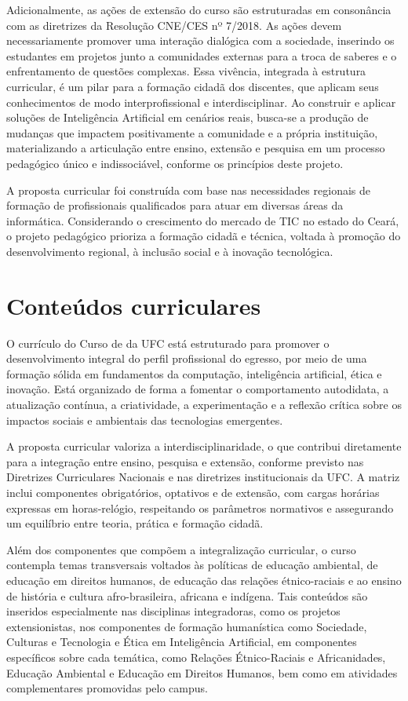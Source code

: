 Adicionalmente, as ações de extensão do curso são estruturadas em consonância com as diretrizes da Resolução CNE/CES nº 7/2018. As ações devem necessariamente promover uma interação dialógica com a sociedade, inserindo os estudantes em projetos junto a comunidades externas para a troca de saberes e o enfrentamento de questões complexas. Essa vivência, integrada à estrutura curricular, é um pilar para a formação cidadã dos discentes, que aplicam seus conhecimentos de modo interprofissional e interdisciplinar. Ao construir e aplicar soluções de Inteligência Artificial em cenários reais, busca-se a produção de mudanças que impactem positivamente a comunidade e a própria instituição, materializando a articulação entre ensino, extensão e pesquisa em um processo pedagógico único e indissociável, conforme os princípios deste projeto.

A proposta curricular foi construída com base nas necessidades regionais de formação de profissionais qualificados para atuar em diversas áreas da informática. Considerando o crescimento do mercado de TIC no estado do Ceará, o projeto pedagógico prioriza a formação cidadã e técnica, voltada à promoção do desenvolvimento regional, à inclusão social e à inovação tecnológica.


\section{Conteúdos curriculares}

O currículo do Curso de \nomedocurso da UFC está estruturado para promover o desenvolvimento integral do perfil profissional do egresso, por meio de uma formação sólida em fundamentos da computação, inteligência artificial, ética e inovação. Está organizado de forma a fomentar o comportamento autodidata, a atualização contínua, a criatividade, a experimentação e a reflexão crítica sobre os impactos sociais e ambientais das tecnologias emergentes.

A proposta curricular valoriza a interdisciplinaridade, o que contribui diretamente para a integração entre ensino, pesquisa e extensão, conforme previsto nas Diretrizes Curriculares Nacionais e nas diretrizes institucionais da UFC. A matriz inclui componentes obrigatórios, optativos e de extensão, com cargas horárias expressas em horas-relógio, respeitando os parâmetros normativos e assegurando um equilíbrio entre teoria, prática e formação cidadã.

Além dos componentes que compõem a integralização curricular, o curso contempla temas transversais voltados às políticas de educação ambiental, de educação em direitos humanos, de educação das relações étnico-raciais e ao ensino de história e cultura afro-brasileira, africana e indígena. Tais conteúdos são inseridos especialmente nas disciplinas integradoras, como os projetos extensionistas, nos componentes de formação humanística como Sociedade, Culturas e Tecnologia e Ética em Inteligência Artificial, em componentes específicos sobre cada temática, como Relações Étnico-Raciais e Africanidades, Educação Ambiental e Educação em Direitos Humanos, bem como em atividades complementares promovidas pelo campus.

